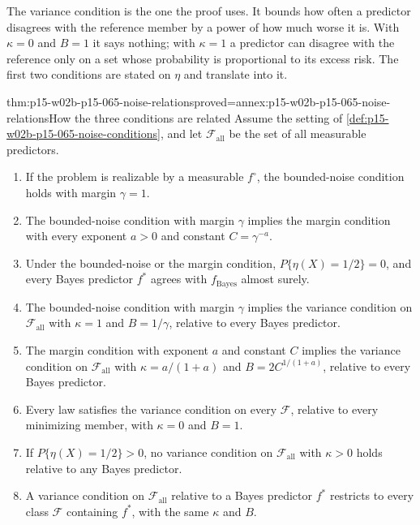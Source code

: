 The variance condition is the one the proof uses. It bounds how often a
predictor disagrees with the reference member by a power of how much worse
it is. With \(\kappa=0\) and \(B=1\) it says nothing; with \(\kappa=1\) a
predictor can disagree with the reference only on a set whose probability
is proportional to its excess risk. The first two conditions are stated
on \(\eta\) and translate into it.

\begin{hblemma}{thm:p15-w02b-p15-065-noise-relations}{proved=annex:p15-w02b-p15-065-noise-relations}{How the three conditions are related}
Assume the setting of \cref{def:p15-w02b-p15-065-noise-conditions}, and
let \(\mathcal F_{\mathrm{all}}\) be the set of all measurable predictors.
\begin{enumerate}
\item If the problem is realizable by a measurable \(f^{\circ}\), the
      bounded-noise condition holds with margin \(\gamma=1\).
\item The bounded-noise condition with margin \(\gamma\) implies the
      margin condition with every exponent \(a>0\) and constant
      \(C=\gamma^{-a}\).
\item Under the bounded-noise or the margin condition,
      \(P\{\eta(X)=1/2\}=0\), and every Bayes predictor \(f^{*}\) agrees
      with \(f_{\mathrm{Bayes}}\) almost surely.
\item The bounded-noise condition with margin \(\gamma\) implies the
      variance condition on \(\mathcal F_{\mathrm{all}}\) with \(\kappa=1\)
      and \(B=1/\gamma\), relative to every Bayes predictor.
\item The margin condition with exponent \(a\) and constant \(C\) implies
      the variance condition on \(\mathcal F_{\mathrm{all}}\) with
      \(\kappa=a/(1+a)\) and \(B=2C^{1/(1+a)}\), relative to every Bayes
      predictor.
\item Every law satisfies the variance condition on every \(\mathcal F\),
      relative to every minimizing member, with \(\kappa=0\) and \(B=1\).
\item If \(P\{\eta(X)=1/2\}>0\), no variance condition on
      \(\mathcal F_{\mathrm{all}}\) with \(\kappa>0\) holds relative to any
      Bayes predictor.
\item A variance condition on \(\mathcal F_{\mathrm{all}}\) relative to a
      Bayes predictor \(f^{*}\) restricts to every class \(\mathcal F\)
      containing \(f^{*}\), with the same \(\kappa\) and \(B\).
\end{enumerate}
\end{hblemma}


